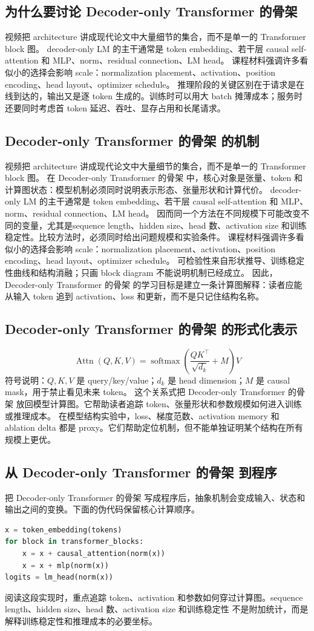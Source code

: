 \documentclass[a4paper]{article}
\begin{document}
\subsection{为什么要讨论 Decoder-only Transformer 的骨架}
视频把 architecture 讲成现代论文中大量细节的集合，而不是单一的 Transformer block 图。
decoder-only LM 的主干通常是 token embedding、若干层 causal self-attention 和 MLP、norm、residual connection、LM head。
课程材料强调许多看似小的选择会影响 scale：normalization placement、activation、position encoding、head layout、optimizer schedule。
推理阶段的关键区别在于请求是在线到达的，输出又是逐 token 生成的。训练时可以用大 batch 摊薄成本；服务时还要同时考虑首 token 延迟、吞吐、显存占用和长尾请求。
\subsection{Decoder-only Transformer 的骨架 的机制}
视频把 architecture 讲成现代论文中大量细节的集合，而不是单一的 Transformer block 图。 在 Decoder-only Transformer 的骨架 中，核心对象是张量、token 和计算图状态：模型机制必须同时说明表示形态、张量形状和计算代价。
decoder-only LM 的主干通常是 token embedding、若干层 causal self-attention 和 MLP、norm、residual connection、LM head。 因而同一个方法在不同规模下可能改变不同的变量，尤其是sequence length、hidden size、head 数、activation size 和训练稳定性。比较方法时，必须同时给出问题规模和实验条件。
课程材料强调许多看似小的选择会影响 scale：normalization placement、activation、position encoding、head layout、optimizer schedule。 可检验性来自形状推导、训练稳定性曲线和结构消融；只画 block diagram 不能说明机制已经成立。
因此，Decoder-only Transformer 的骨架 的学习目标是建立一条计算图解释：读者应能从输入 token 追到 activation、loss 和更新，而不是只记住结构名称。
\subsection{Decoder-only Transformer 的骨架 的形式化表示}
\[\operatorname{Attn}(Q,K,V)=\operatorname{softmax}\left(\frac{QK^\top}{\sqrt{d_k}}+M\right)V\]
符号说明：\(Q,K,V\) 是 query/key/value；\(d_k\) 是 head dimension；\(M\) 是 causal mask，用于禁止看见未来 token。
这个关系式把 Decoder-only Transformer 的骨架 放回模型计算图。它帮助读者追踪 token、张量形状和参数规模如何进入训练或推理成本。
在模型结构实验中，loss、梯度范数、activation memory 和 ablation delta 都是 proxy。它们帮助定位机制，但不能单独证明某个结构在所有规模上更优。
\subsection{从 Decoder-only Transformer 的骨架 到程序}
把 Decoder-only Transformer 的骨架 写成程序后，抽象机制会变成输入、状态和输出之间的变换。下面的伪代码保留核心计算顺序。
\begin{lstlisting}[language=Python]
x = token_embedding(tokens)
for block in transformer_blocks:
    x = x + causal_attention(norm(x))
    x = x + mlp(norm(x))
logits = lm_head(norm(x))
\end{lstlisting}
阅读这段实现时，重点追踪 token、activation 和参数如何穿过计算图。sequence length、hidden size、head 数、activation size 和训练稳定性 不是附加统计，而是解释训练稳定性和推理成本的必要坐标。
\end{document}
